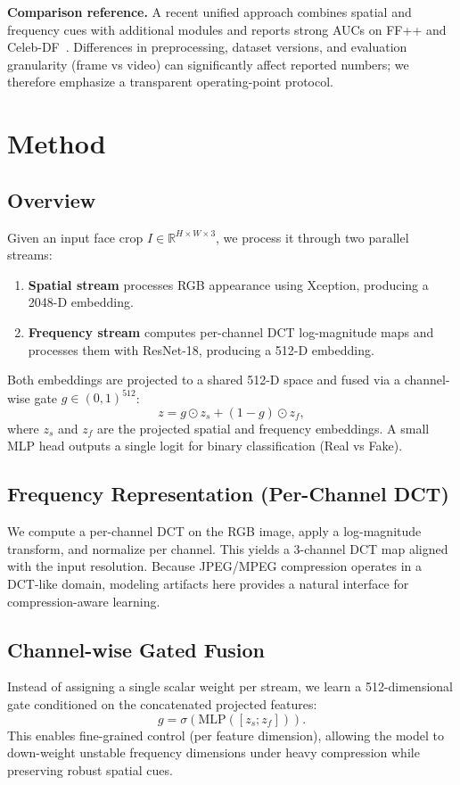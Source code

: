 \documentclass[conference]{IEEEtran}
\begin{document}
\textbf{Comparison reference.} A recent unified approach combines spatial and frequency cues with additional modules and reports strong AUCs on FF++ and Celeb-DF~\cite{mukherjee2026unified}. Differences in preprocessing, dataset versions, and evaluation granularity (frame vs video) can significantly affect reported numbers; we therefore emphasize a transparent operating-point protocol.

\section{Method}
\subsection{Overview}
Given an input face crop $I \in \mathbb{R}^{H \times W \times 3}$, we process it through two parallel streams:
\begin{enumerate}
  \item \textbf{Spatial stream} processes RGB appearance using Xception, producing a 2048-D embedding.
  \item \textbf{Frequency stream} computes per-channel DCT log-magnitude maps and processes them with ResNet-18, producing a 512-D embedding.
\end{enumerate}
Both embeddings are projected to a shared 512-D space and fused via a channel-wise gate $g \in (0,1)^{512}$:
\begin{equation}
  z = g \odot z_s + (1-g) \odot z_f,
\end{equation}
where $z_s$ and $z_f$ are the projected spatial and frequency embeddings. A small MLP head outputs a single logit for binary classification (Real vs Fake).

\subsection{Frequency Representation (Per-Channel DCT)}
We compute a per-channel DCT on the RGB image, apply a log-magnitude transform, and normalize per channel. This yields a 3-channel DCT map aligned with the input resolution. Because JPEG/MPEG compression operates in a DCT-like domain, modeling artifacts here provides a natural interface for compression-aware learning.

\subsection{Channel-wise Gated Fusion}
Instead of assigning a single scalar weight per stream, we learn a 512-dimensional gate conditioned on the concatenated projected features:
\begin{equation}
  g = \sigma(\mathrm{MLP}([z_s; z_f])).
\end{equation}
This enables fine-grained control (per feature dimension), allowing the model to down-weight unstable frequency dimensions under heavy compression while preserving robust spatial cues.
\end{document}
